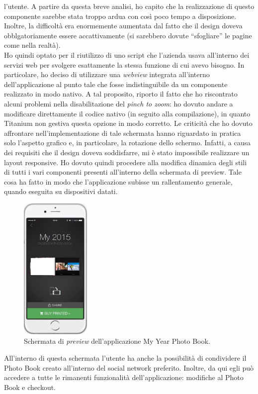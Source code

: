 				l'utente. A partire da questa breve analisi, ho capito che la realizzazione di questo componente sarebbe stata
				troppo ardua con così poco tempo a disposizione. Inoltre, la difficoltà era enormemente aumentata dal fatto che il
				design doveva obblgatoriamente essere accattivamente (si sarebbero dovute “sfogliare” le pagine come nella realtà).\\
				Ho quindi optato per il riutilizzo di uno script che l'azienda usava all'interno dei servizi web per svolgere
				esattamente la stessa funzione di cui avevo bisogno. In particolare, ho deciso di utilizzare una \emph{webview}
				integrata all'interno dell'applicazione al punto tale che fosse indistinguibile da un componente realizzato in modo
				nativo. A tal proposito, riporto il fatto che ho riscontrato alcuni problemi nella disabilitazione del
				\emph{pinch to zoom}: ho dovuto andare a modificare direttamente il codice nativo (in seguito alla compilazione),
				in quanto Titanium non gestiva questa opzione in modo corretto.
				Le criticità che ho dovuto affrontare nell'implementazione di tale schermata hanno riguardato in pratica solo
				l'aspetto grafico e, in particolare, la rotazione dello schermo. Infatti, a causa dei requisiti che il design doveva
				soddisfarre, mi è stato impossibile realizzare un layout responsive. Ho dovuto quindi procedere alla modifica
				dinamica degli stili di tutti i vari componenti presenti all'interno della schermata di preview. Tale cosa ha fatto
				in modo che l'applicazione subisse un rallentamento generale, quando eseguita su dispositivi datati.
				\begin{figure}[H]
					\centering
					\includegraphics[width=0.3\textwidth]{capitolo_3/immagini/schermata_di_visualizzazione.png}
					\caption{Schermata di \emph{preview} dell'applicazione My Year Photo Book.}
				\end{figure}
				\noindent All'interno di questa schermata l'utente ha anche la possibilità di condividere il Photo Book creato
				all'interno del social network preferito. Inoltre, da qui egli può accedere a tutte le rimanenti funzionalità
				dell'applicazione: modifiche al Photo Book e checkout.
